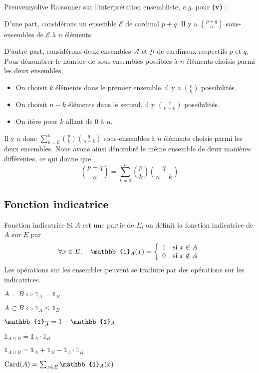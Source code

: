     \begin{demo}{Preuve}{myolive}
        Raisonner sur l’interprétation ensembliste, \textit{e.g.} pour \textbf{(v)} :

        D’une part, considérons un ensemble $\mathcal{E}$ de cardinal $p+q$. Il y a $\binom{p+q}{n}$ sous-ensembles de $\mathcal{E}$ à $n$ éléments. 

        D’autre part, considérons deux ensembles $\mathcal{A}$ et $\mathcal{G}$ de cardinaux respectifs $p$ et $q$. Pour dénombrer le nombre de sous-ensembles possibles à $n$ éléments choisis parmi les deux ensembles, 
        \begin{itemize}
            \item On choisit $k$ éléments dans le premier ensemble, il y a $\binom{p}{k}$ possibilités.
            \item On choisit $n-k$ éléments dans le second, il y $\binom{q}{n-k}$ possibilités.
            \item On itère pour $k$ allant de $0$ à $n$.
        \end{itemize}
        Il y a donc $\sum\limits_{k=0}^n \binom{p}{k} \binom{q}{n-k}$ sous-ensembles à $n$ éléments choisis parmi les deux ensembles. Nous avons ainsi dénombré le même ensemble de deux manières différentes, ce qui donne que 
        \[ \binom{p+q}{n} = \sum\limits_{k=0}^n \binom{p}{k} \binom{q}{n-k} \] 
    \end{demo}

    \subsection{Fonction indicatrice}

    \begin{defitheo}{Fonction indicatrice}{}
        Si $A$ est une partie de $E$, on définit la fonction indicatrice de $A$ sur $E$ par 
        \[ \forall x \in E, \quad \mathbb{1}_A(x) = \sisi{1}{x \in A}{0}{x \notin A} \]   
        Les opérations sur les ensembles peuvent se traduire par des opérations sur les indicatrices.
        \begin{enumerate}
            \begin{multicols}{2}
                \item $A = B \iff \mathbb{1}_A = \mathbb{1}_B$
                \item $A \subset B \iff \mathbb{1}_A \leq \mathbb{1}_B$ 
                \item $\mathbb{1}_{\barr{A}} = 1 - \mathbb{1}_A$
                \item $\mathbb{1}_{A \cap B} = \mathbb{1}_A \cdotp \mathbb{1}_B$
                \item $\mathbb{1}_{A \cup B} = \mathbb{1}_A + \mathbb{1}_B - \mathbb{1}_A \cdotp \mathbb{1}_B$
                \item $\card(A)= \sum_{x \in E} \mathbb{1}_A(x)$
            \end{multicols}
        \end{enumerate}
    \end{defitheo}

